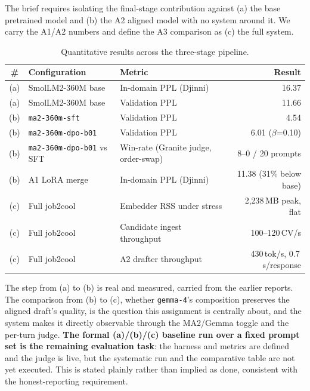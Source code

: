 The brief requires isolating the final-stage contribution against (a) the base pretrained
model and (b) the A2 aligned model with no system around it. We carry the A1/A2 numbers and
define the A3 comparison as (c) the full system.

\begin{table}[h]
\centering
\caption{Quantitative results across the three-stage pipeline.}
\begin{tabular}{cllr}
\toprule
\textbf{\#} & \textbf{Configuration} & \textbf{Metric} & \textbf{Result} \\
\midrule
(a) & SmolLM2-360M base            & In-domain PPL (Djinni)                & 16.37 \\
(a) & SmolLM2-360M base            & Validation PPL                        & 11.66 \\
(b) & \texttt{ma2-360m-sft}        & Validation PPL                        & 4.54  \\
(b) & \texttt{ma2-360m-dpo-b01}    & Validation PPL                        & 6.01 ($\beta$=0.10) \\
(b) & \texttt{ma2-360m-dpo-b01} vs SFT & Win-rate (Granite judge, order-swap) & 8--0 / 20 prompts \\
(b) & A1 LoRA merge                & In-domain PPL (Djinni)                & 11.38 (31\% below base) \\
(c) & Full job2cool                & Embedder RSS under stress             & 2,238\,MB peak, flat \\
(c) & Full job2cool                & Candidate ingest throughput           & 100--120\,CV/s \\
(c) & Full job2cool                & A2 drafter throughput                 & 430\,tok/s, 0.7\,s/response \\
\bottomrule
\end{tabular}
\end{table}

The step from (a) to (b) is real and measured, carried from the earlier reports. The
comparison from (b) to (c), whether \verb|gemma-4|'s composition preserves the aligned
draft's quality, is the question this assignment is centrally about, and the system makes
it directly observable through the MA2/Gemma toggle and the per-turn judge.
\textbf{The formal (a)/(b)/(c) baseline run over a fixed prompt set is the remaining
evaluation task}: the harness and metrics are defined and the judge is live, but the
systematic run and the comparative table are not yet executed. This is stated plainly
rather than implied as done, consistent with the honest-reporting requirement.

